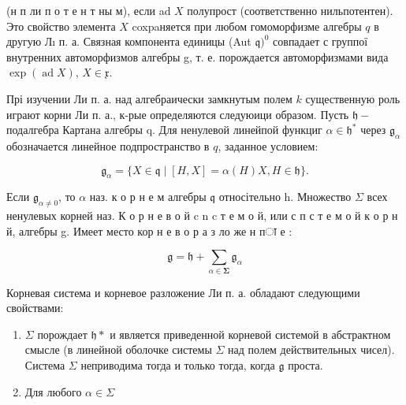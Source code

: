 \documentclass[10pt]{article}
\begin{document}
(н п ли п о т е н т ны м), если ad $X$ полупрост (соответственно нильпотентен). Это свойство элемента $X$ coxpaняется при любом гомоморфизме алгебры $q$ в другую Лı п. а. Связная компонента единицы (Aut $\mathfrak{q})^{0}$ совпадает с группої внутренних автоморфизмов алгебры g, т. е. порождается автоморфизмами вида $\exp (\operatorname{ad} X)$, $X \in \mathfrak{x}$.



Прі изучении Ли п. а. над алгебраически замкнутым полем $k$ существенную роль играют корни Ли п. а., к-рые определяются следуюици образом. Пусть $\mathfrak{h}-$ подалгебра Картана алгебры q. Для ненулевой линейпой функциг $\alpha \in \mathfrak{h}^{*}$ через $\mathfrak{g}_{\alpha}$ обозначается линейное подпространство в $q$, заданное условием:



\[

\mathfrak{g}_{\alpha}=\{X \in \mathfrak{q} \mid[H, X]=\alpha(H) X, H \in \mathfrak{h}\} .

\]



Если $\mathfrak{g}_{\alpha \neq 0}$, то $\alpha$ наз. к о р н е м алгебры $\mathfrak{q}$ относітельно h. Множество $\Sigma$ всех ненулевых корней наз. К о р н е в о й c n c т е м о й, или с п с т е м о й к о р н й, алгебры g. Имеет место кор н е в о р а $з$ ло же н пा $е$ :



\[

\mathfrak{g}=\mathfrak{h}+\sum_{\alpha \in \mathbf{\Sigma}} \mathfrak{g}_{\alpha}

\]



Корневая система и корневое разложение Ли п. а. обладают следующими свойствами:



\begin{enumerate}

  \item $\Sigma$ порождает $\mathfrak{h} *$ и является приведенной корневой системой в абстрактном смысле (в линейной оболочке системы $\Sigma$ над полем действительных чисел). Система $\Sigma$ неприводима тогда и только тогда, когда $\mathfrak{g}$ проста.



  \item Для любого $\alpha \in \Sigma$



\end{enumerate}
\end{document}
